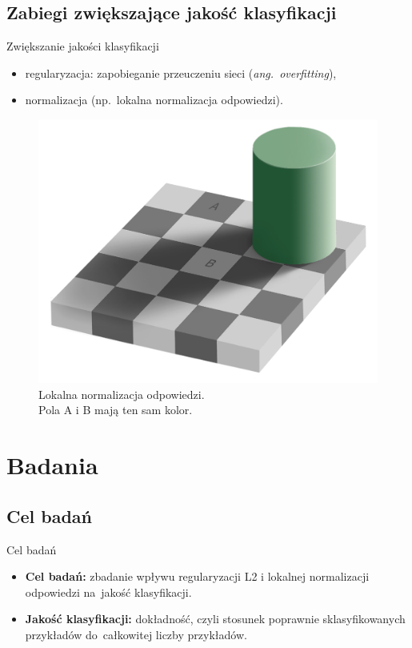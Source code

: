 \documentclass[xcolor=dvipsnames]{beamer}
\begin{document}
\subsection{Zabiegi zwiększające jakość klasyfikacji}
\begin{frame}{Zwiększanie jakości klasyfikacji}
    \begin{minipage}[t]{0.48\linewidth}
        \begin{itemize}
            \item regularyzacja: zapobieganie przeuczeniu sieci (\textit{ang.~overfitting}),
            \item normalizacja (np.~lokalna normalizacja odpowiedzi).
        \end{itemize}
	\end{minipage}%
	\hfill
	\begin{minipage}[t]{0.48\linewidth}
        \begin{figure}
            \includegraphics[width=\linewidth, height=0.7\textheight, keepaspectratio] {img/chess-illusion.png}
            \caption{Lokalna normalizacja odpowiedzi. \\
            Pola A i B mają ten sam kolor.}
        \end{figure}
	\end{minipage}
\end{frame}

\section{Badania}
\subsection{Cel badań}
\begin{frame}{Cel badań}
	\begin{itemize}
	    \item \textbf{Cel badań:} zbadanie wpływu regularyzacji L2 i lokalnej normalizacji odpowiedzi na~jakość
	    klasyfikacji.
	    \item \textbf{Jakość klasyfikacji:} dokładność, czyli stosunek poprawnie sklasyfikowanych przykładów
	           do~całkowitej liczby przykładów.
    \end{itemize}
\end{frame}
\end{document}
